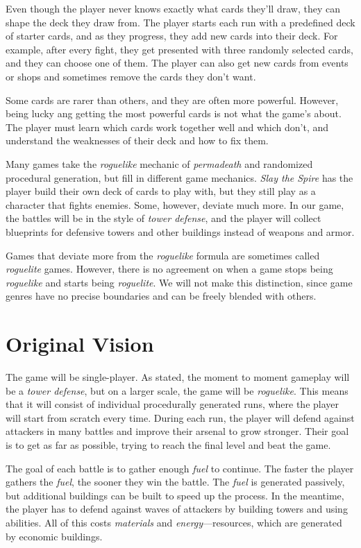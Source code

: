 Even though the player never knows exactly what cards they'll draw, they can shape the deck they draw from.
The player starts each run with a predefined deck of starter cards, and as they progress, they add new cards into their deck.
For example, after every fight, they get presented with three randomly selected cards, and they can choose one of them.
The player can also get new cards from events or shops and sometimes remove the cards they don't want.

Some cards are rarer than others, and they are often more powerful.
However, being lucky ang getting the most powerful cards is not what the game's about.
The player must learn which cards work together well and which don't, and understand the weaknesses of their deck and how to fix them.

Many games take the \emph{roguelike} mechanic of \emph{permadeath} and randomized procedural generation, but fill in different game mechanics.
\emph{Slay the Spire} has the player build their own deck of cards to play with, but they still play as a character that fights enemies.
Some, however, deviate much more.
In our game, the battles will be in the style of \emph{tower defense}, and the player will collect blueprints for defensive towers and other buildings instead of weapons and armor.

Games that deviate more from the \emph{roguelike} formula are sometimes called \emph{roguelite} games.
However, there is no agreement on when a game stops being \emph{roguelike} and starts being \emph{roguelite}.
We will not make this distinction, since game genres have no precise boundaries and can be freely blended with others.

\section{Original Vision} \label{sec:original-vision}

The game will be single-player.
As stated, the moment to moment gameplay will be a \emph{tower defense}, but on a larger scale, the game will be \emph{roguelike}.
This means that it will consist of individual procedurally generated runs, where the player will start from scratch every time.
During each run, the player will defend against attackers in many battles and improve their arsenal to grow stronger.
Their goal is to get as far as possible, trying to reach the final level and beat the game.

The goal of each battle is to gather enough \emph{fuel} to continue.
The faster the player gathers the \emph{fuel}, the sooner they win the battle.
The \emph{fuel} is generated passively, but additional buildings can be built to speed up the process.
In the meantime, the player has to defend against waves of attackers by building towers and using abilities.
All of this costs \emph{materials} and \emph{energy}---resources, which are generated by economic buildings.

